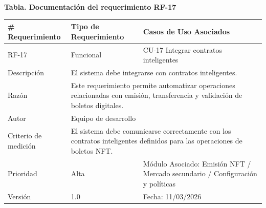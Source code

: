 \documentclass[12pt,letterpaper]{article}
\begin{document}
\noindent
\begin{minipage}{\textwidth}
\centering
\scriptsize
\renewcommand{\arraystretch}{0.9}
\setlength{\tabcolsep}{3pt}
\setlength{\arrayrulewidth}{0.5pt}

\textbf{Tabla. Documentación del requerimiento RF-17}

\vspace{2pt}

\begin{tabularx}{\textwidth}{|p{2.6cm}|X|p{3.4cm}|}
\hline
\# Requerimiento & Tipo de Requerimiento & Casos de Uso Asociados \\ \hline
RF-17 & Funcional & CU-17 Integrar contratos inteligentes \\ \hline
Descripción & \multicolumn{2}{X|}{El sistema debe integrarse con contratos inteligentes.} \\ \hline
Razón & \multicolumn{2}{X|}{Este requerimiento permite automatizar operaciones relacionadas con emisión, transferencia y validación de boletos digitales.} \\ \hline
Autor & \multicolumn{2}{X|}{Equipo de desarrollo} \\ \hline
Criterio de medición & \multicolumn{2}{X|}{El sistema debe comunicarse correctamente con los contratos inteligentes definidos para las operaciones de boletos NFT.} \\ \hline
Prioridad & Alta & Módulo Asociado: Emisión NFT / Mercado secundario / Configuración y políticas \\ \hline
Versión & 1.0 & Fecha: 11/03/2026 \\ \hline
\end{tabularx}
\end{minipage}

\vspace{0.2cm}
\end{document}

